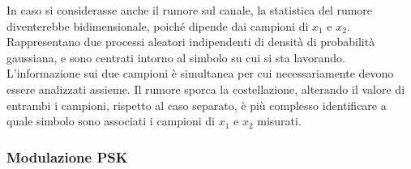 \documentclass{article}
\numberwithin{equation}{subsection}
\begin{document}
In caso si considerasse anche il rumore sul canale, la statistica del rumore diventerebbe bidimensionale, poiché dipende dai campioni di $x_1$ e $x_2$. Rappresentano 
due processi aleatori indipendenti di densità di probabilità gaussiana, e sono centrati intorno al simbolo su cui si sta lavorando. L'informazione sui due campioni è 
simultanea per cui necessariamente devono essere analizzati assieme. Il rumore sporca la costellazione, alterando il valore di entrambi i campioni, rispetto al 
caso separato, è più complesso identificare a quale simbolo sono associati i campioni di $x_1$ e $x_2$ misurati. 

\subsubsection{Modulazione PSK}
\end{document}
